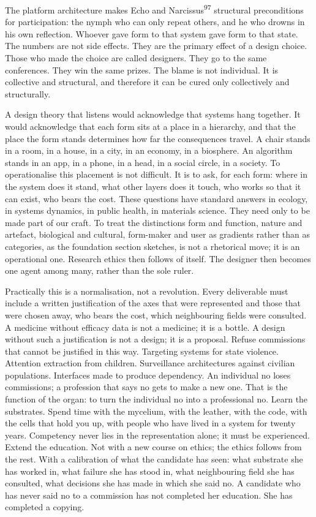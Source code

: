 \begin{widebody}
{The platform architecture makes Echo and Narcissus\textsuperscript{97} structural preconditions for participation: the nymph who can only repeat others, and he who drowns in his own reflection. Whoever gave form to that system gave form to that state. The numbers are not side effects. They are the primary effect of a design choice. Those who made the choice are called designers. They go to the same conferences. They win the same prizes. The blame is not individual. It is collective and structural, and therefore it can be cured only collectively and structurally.

A design theory that listens would acknowledge that systems hang together. It would acknowledge that each form sits at a place in a hierarchy, and that the place the form stands determines how far the consequences travel. A chair stands in a room, in a house, in a city, in an economy, in a biosphere. An algorithm stands in an app, in a phone, in a head, in a social circle, in a society. To operationalise this placement is not difficult. It is to ask, for each form: where in the system does it stand, what other layers does it touch, who works so that it can exist, who bears the cost. These questions have standard answers in ecology, in systems dynamics, in public health, in materials science. They need only to be made part of our craft. To treat the distinctions form and function, nature and artefact, biological and cultural, form-maker and user as gradients rather than as categories, as the foundation section sketches, is not a rhetorical move; it is an operational one. Research ethics then follows of itself. The designer then becomes one agent among many, rather than the sole ruler.

Practically this is a normalisation, not a revolution. Every deliverable must include a written justification of the axes that were represented and those that were chosen away, who bears the cost, which neighbouring fields were consulted. A medicine without efficacy data is not a medicine; it is a bottle. A design without such a justification is not a design; it is a proposal. Refuse commissions that cannot be justified in this way. Targeting systems for state violence. Attention extraction from children. Surveillance architectures against civilian populations. Interfaces made to produce dependency. An individual no loses commissions; a profession that says no gets to make a new one. That is the function of the organ: to turn the individual no into a professional no. Learn the substrates. Spend time with the mycelium, with the leather, with the code, with the cells that hold you up, with people who have lived in a system for twenty years. Competency never lies in the representation alone; it must be experienced. Extend the education. Not with a new course on ethics; the ethics follows from the rest. With a calibration of what the candidate has seen: what substrate she has worked in, what failure she has stood in, what neighbouring field she has consulted, what decisions she has made in which she said no. A candidate who has never said no to a commission has not completed her education. She has completed a copying.

}
\end{widebody}
